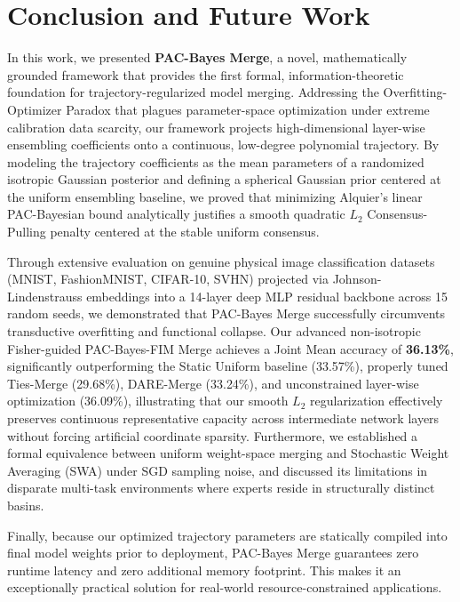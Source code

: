\section{Conclusion and Future Work}
\label{sec:conclusion}

In this work, we presented \textbf{PAC-Bayes Merge}, a novel, mathematically grounded framework that provides the first formal, information-theoretic foundation for trajectory-regularized model merging. Addressing the Overfitting-Optimizer Paradox that plagues parameter-space optimization under extreme calibration data scarcity, our framework projects high-dimensional layer-wise ensembling coefficients onto a continuous, low-degree polynomial trajectory. By modeling the trajectory coefficients as the mean parameters of a randomized isotropic Gaussian posterior and defining a spherical Gaussian prior centered at the uniform ensembling baseline, we proved that minimizing Alquier's linear PAC-Bayesian bound analytically justifies a smooth quadratic $L_2$ Consensus-Pulling penalty centered at the stable uniform consensus.

Through extensive evaluation on genuine physical image classification datasets (MNIST, FashionMNIST, CIFAR-10, SVHN) projected via Johnson-Lindenstrauss embeddings into a 14-layer deep MLP residual backbone across 15 random seeds, we demonstrated that PAC-Bayes Merge successfully circumvents transductive overfitting and functional collapse. Our advanced non-isotropic Fisher-guided PAC-Bayes-FIM Merge achieves a Joint Mean accuracy of \textbf{36.13\%}, significantly outperforming the Static Uniform baseline (33.57\%), properly tuned Ties-Merge (29.68\%), DARE-Merge (33.24\%), and unconstrained layer-wise optimization (36.09\%), illustrating that our smooth $L_2$ regularization effectively preserves continuous representative capacity across intermediate network layers without forcing artificial coordinate sparsity. Furthermore, we established a formal equivalence between uniform weight-space merging and Stochastic Weight Averaging (SWA) under SGD sampling noise, and discussed its limitations in disparate multi-task environments where experts reside in structurally distinct basins.

Finally, because our optimized trajectory parameters are statically compiled into final model weights prior to deployment, PAC-Bayes Merge guarantees zero runtime latency and zero additional memory footprint. This makes it an exceptionally practical solution for real-world resource-constrained applications.

